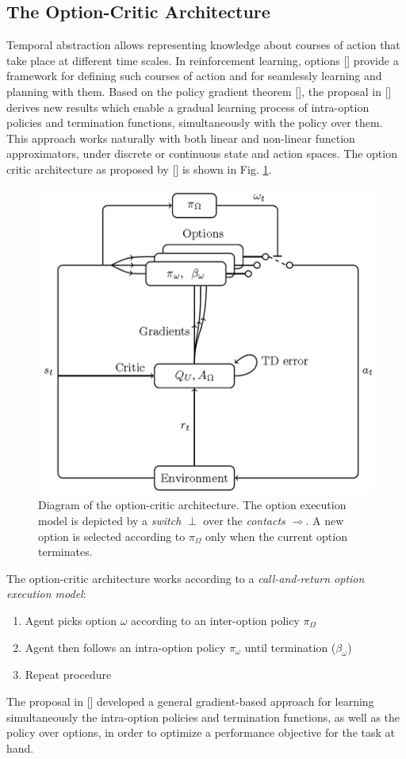 \documentclass[conference]{IEEEtran}
\begin{document}
\subsection{The Option-Critic Architecture}
Temporal abstraction allows representing knowledge about courses of action that take place at different time scales. In reinforcement learning, options [\cite{sutton1999between}] provide a framework for defining such courses of action and for seamlessly learning and planning with them. Based on the policy gradient theorem [\cite{sutton2000policy}], the proposal in [\cite{bacon2017option}] derives new results which enable a gradual learning process of intra-option policies and termination functions, simultaneously with the policy over them. This approach works naturally with both linear and non-linear function approximators, under discrete or continuous state and action spaces. The option critic architecture as proposed by [\cite{bacon2017option}] is shown in Fig. \ref{fig:option_critic_arch}. 
\begin{figure}[ht]
\centering
\includegraphics[width=0.9\columnwidth]{img/OptionCriticArch.png}
\caption{Diagram of the option-critic architecture. The option execution model is depicted by a \textit{switch} $\perp$ over the \textit{contacts} $\multimap$. A new option is selected according to $\pi_{\Omega}$ only when the current option terminates.}
\label{fig:option_critic_arch}
\end{figure}

The option-critic architecture works according to a \textit{call-and-return option execution model}:
\begin{enumerate}
    \item Agent picks option $\omega$ according to an inter-option policy $\pi_{\Omega}$
    \item Agent then follows an intra-option policy $\pi_{\omega}$ until termination ($\beta_{\omega}$)
    \item Repeat procedure
\end{enumerate}
The proposal in [\cite{bacon2017option}] developed a general gradient-based approach for learning simultaneously the intra-option policies and termination functions, as well as the policy over options, in order to optimize a performance objective for the task at hand.
\end{document}
